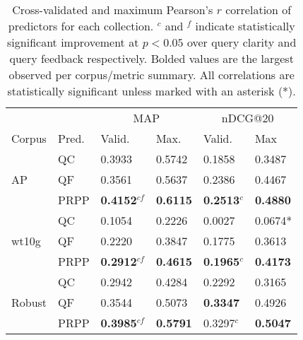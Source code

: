 \documentclass{sig-alternate}
\begin{document}
\begin{table}
\begin{tabular}{|l|l|l|l|l|l|} \hline
& & \multicolumn{2}{c|}{MAP} & \multicolumn{2}{c|}{nDCG@20} \\ \cline{3-6}
Corpus & Pred. & Valid. & Max. & Valid. & Max \\ \hline\hline
\multirow{3}{*}{AP} & QC & 0.3933 & 0.5742 & 0.1858 & 0.3487 \\ \cline{2-6}
& QF & 0.3561 & 0.5637 & 0.2386 & 0.4467 \\ \cline{2-6}
& PRPP & \textbf{0.4152}$^{cf}$ & \textbf{0.6115} & \textbf{0.2513}$^{c}$ & \textbf{0.4880} \\ \hline\hline
\multirow{3}{*}{wt10g} & QC & 0.1054 & 0.2226 & 0.0027 & 0.0674* \\ \cline{2-6}
& QF & 0.2220 & 0.3847 & 0.1775 & 0.3613 \\ \cline{2-6}
& PRPP & \textbf{0.2912}$^{cf}$ & \textbf{0.4615} & \textbf{0.1965}$^{c}$ & \textbf{0.4173} \\ \hline\hline
\multirow{3}{*}{Robust} & QC & 0.2942 & 0.4284 & 0.2292 & 0.3165 \\ \cline{2-6}
& QF & 0.3544 & 0.5073 & \textbf{0.3347} & 0.4926 \\ \cline{2-6}
& PRPP & \textbf{0.3985}$^{cf}$ & \textbf{0.5791} & 0.3297$^{c}$ & \textbf{0.5047} \\ \hline
\end{tabular}
\caption{Cross-validated and maximum Pearson's $r$ correlation of predictors for each collection. $^c$ and $^f$ indicate statistically significant improvement at $p < 0.05$ over query clarity and query feedback respectively. Bolded values are the largest observed per corpus/metric summary. All correlations are statistically significant unless marked with an asterisk (*).}
\label{table.results.self.pearson}
\end{table}
\end{document}
